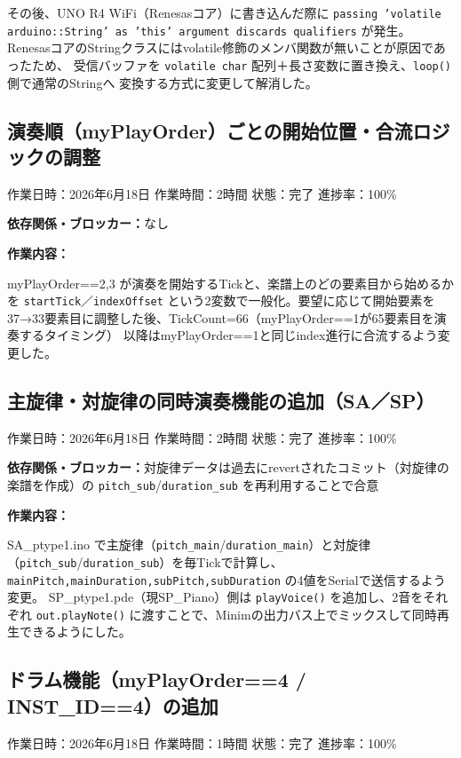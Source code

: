 \documentclass[uplatex,dvipdfmx]{jlreq}
\begin{document}
その後、UNO R4 WiFi（Renesasコア）に書き込んだ際に
\texttt{passing 'volatile arduino::String' as 'this' argument discards qualifiers} が発生。
RenesasコアのStringクラスにはvolatile修飾のメンバ関数が無いことが原因であったため、
受信バッファを \texttt{volatile char} 配列＋長さ変数に置き換え、\texttt{loop()} 側で通常のStringへ
変換する方式に変更して解消した。

\subsection{演奏順（myPlayOrder）ごとの開始位置・合流ロジックの調整}
\noindent
作業日時：2026年6月18日 \quad 作業時間：2時間
状態：完了 \quad 進捗率：100\%

\noindent
\textbf{依存関係・ブロッカー：}なし

\noindent
\textbf{作業内容：}

myPlayOrder==2,3 が演奏を開始するTickと、楽譜上のどの要素目から始めるかを
\texttt{startTick}／\texttt{indexOffset} という2変数で一般化。要望に応じて開始要素を
37→33要素目に調整した後、TickCount=66（myPlayOrder==1が65要素目を演奏するタイミング）
以降はmyPlayOrder==1と同じindex進行に合流するよう変更した。

\subsection{主旋律・対旋律の同時演奏機能の追加（SA／SP）}
\noindent
作業日時：2026年6月18日 \quad 作業時間：2時間
状態：完了 \quad 進捗率：100\%

\noindent
\textbf{依存関係・ブロッカー：}対旋律データは過去にrevertされたコミット（対旋律の楽譜を作成）の
\texttt{pitch\_sub}/\texttt{duration\_sub} を再利用することで合意

\noindent
\textbf{作業内容：}

SA\_ptype1.ino で主旋律（\texttt{pitch\_main}/\texttt{duration\_main}）と対旋律
（\texttt{pitch\_sub}/\texttt{duration\_sub}）を毎Tickで計算し、
\texttt{mainPitch,mainDuration,subPitch,subDuration} の4値をSerialで送信するよう変更。
SP\_ptype1.pde（現SP\_Piano）側は \texttt{playVoice()} を追加し、2音をそれぞれ
\texttt{out.playNote()} に渡すことで、Minimの出力バス上でミックスして同時再生できるようにした。

\subsection{ドラム機能（myPlayOrder==4 / INST\_ID==4）の追加}
\noindent
作業日時：2026年6月18日 \quad 作業時間：1時間
状態：完了 \quad 進捗率：100\%
\end{document}

